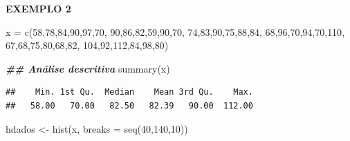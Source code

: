 \documentclass[
]{article}
\newenvironment{Shaded}{\begin{snugshade}}{\end{snugshade}}
\newcommand{\AttributeTok}[1]{\textcolor[rgb]{0.77,0.63,0.00}{#1}}
\newcommand{\DecValTok}[1]{\textcolor[rgb]{0.00,0.00,0.81}{#1}}
\newcommand{\DocumentationTok}[1]{\textcolor[rgb]{0.56,0.35,0.01}{\textbf{\textit{#1}}}}
\newcommand{\FunctionTok}[1]{\textcolor[rgb]{0.00,0.00,0.00}{#1}}
\newcommand{\NormalTok}[1]{#1}
\newcommand{\OtherTok}[1]{\textcolor[rgb]{0.56,0.35,0.01}{#1}}
\begin{document}
\textbf{EXEMPLO 2}

\begin{Shaded}
\begin{Highlighting}[]
\NormalTok{x }\OtherTok{=} \FunctionTok{c}\NormalTok{(}\DecValTok{58}\NormalTok{,}\DecValTok{78}\NormalTok{,}\DecValTok{84}\NormalTok{,}\DecValTok{90}\NormalTok{,}\DecValTok{97}\NormalTok{,}\DecValTok{70}\NormalTok{,}
      \DecValTok{90}\NormalTok{,}\DecValTok{86}\NormalTok{,}\DecValTok{82}\NormalTok{,}\DecValTok{59}\NormalTok{,}\DecValTok{90}\NormalTok{,}\DecValTok{70}\NormalTok{,}
      \DecValTok{74}\NormalTok{,}\DecValTok{83}\NormalTok{,}\DecValTok{90}\NormalTok{,}\DecValTok{75}\NormalTok{,}\DecValTok{88}\NormalTok{,}\DecValTok{84}\NormalTok{,}
      \DecValTok{68}\NormalTok{,}\DecValTok{96}\NormalTok{,}\DecValTok{70}\NormalTok{,}\DecValTok{94}\NormalTok{,}\DecValTok{70}\NormalTok{,}\DecValTok{110}\NormalTok{,}
      \DecValTok{67}\NormalTok{,}\DecValTok{68}\NormalTok{,}\DecValTok{75}\NormalTok{,}\DecValTok{80}\NormalTok{,}\DecValTok{68}\NormalTok{,}\DecValTok{82}\NormalTok{,}
      \DecValTok{104}\NormalTok{,}\DecValTok{92}\NormalTok{,}\DecValTok{112}\NormalTok{,}\DecValTok{84}\NormalTok{,}\DecValTok{98}\NormalTok{,}\DecValTok{80}\NormalTok{)}


\DocumentationTok{\#\# Análise descritiva}
\FunctionTok{summary}\NormalTok{(x)}
\end{Highlighting}
\end{Shaded}

\begin{verbatim}
##    Min. 1st Qu.  Median    Mean 3rd Qu.    Max. 
##   58.00   70.00   82.50   82.39   90.00  112.00
\end{verbatim}

\begin{Shaded}
\begin{Highlighting}[]
\NormalTok{hdados }\OtherTok{\textless{}{-}} \FunctionTok{hist}\NormalTok{(x, }
               \AttributeTok{breaks =} \FunctionTok{seq}\NormalTok{(}\DecValTok{40}\NormalTok{,}\DecValTok{140}\NormalTok{,}\DecValTok{10}\NormalTok{))}
\end{Highlighting}
\end{Shaded}
\end{document}
